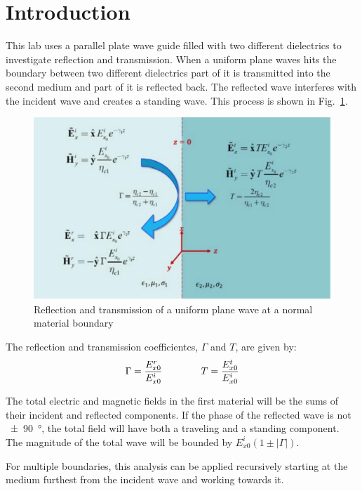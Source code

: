 \section{Introduction}\label{sec:intro}
This lab uses a parallel plate wave guide filled with two different dielectrics to investigate reflection and transmission.
When a uniform plane waves hits the boundary between two different dielectrics part of it is transmitted into the second medium and part of it is reflected back.
The reflected wave interferes with the incident wave and creates a standing wave.
This process is shown in Fig.~\ref{fig:ref_and_trans}.

\begin{figure}[tbph]
	\centering
	\includegraphics[width=0.7\linewidth]{graphics/ref_and_trans}
	\caption{Reflection and transmission of a uniform plane wave at a normal material boundary}
	\label{fig:ref_and_trans}
\end{figure}

The reflection and transmission coefficientcs, $\Gamma$ and $T$, are given by:
\begin{equation}\label{eqn:coefs}
	\Gamma = { E_{x0}^r \over E_{x0}^i } \qquad\qquad T = { E_{x0}^t \over E_{x0}^i }
\end{equation}

The total electric and magnetic fields in the first material will be the sums of their incident and reflected components.
If the phase of the reflected wave is not \SI{+-90}{\degree}, the total field will have both a traveling and a standing component.
The magnitude of the total wave will be bounded by $E_{x0}^i\left(1 \pm \left|\Gamma\right|\right)$.

For multiple boundaries, this analysis can be applied recursively starting at the medium furthest from the incident wave and working towards it.
